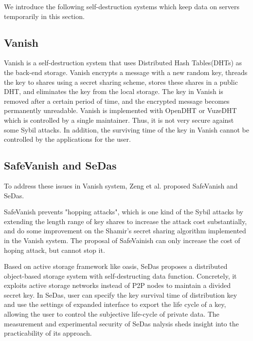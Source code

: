 \documentclass[a4paper,11pt]{report}
\begin{document}
We introduce the following self-destruction systems which keep data on servers temporarily in this section.

\subsection{Vanish}

Vanish\cite{geambasu2009vanish} is a self-destruction system that uses Distributed Hash Tables(DHTs) as the back-end storage.
Vanish encrypts a message with a new random key, threads the key to shares using a secret sharing scheme, stores these shares in a public DHT, and eliminates the key from the local storage.
The key in Vanish is removed after a certain period of time, and the encrypted message becomes permanently unreadable.
Vanish is implemented with OpenDHT\cite{rhea2005opendht} or VuzeDHT\cite{vuzedht} which is controlled by a single maintainer. 
Thus, it is not very secure against some Sybil attacks\cite{cholez2009evaluation, wolchok2010defeating}. 
In addition, the surviving time of the key in Vanish cannot be controlled by the applications for the user.

\subsection{SafeVanish and SeDas}

To address these issues in Vanish system, Zeng et al. proposed SafeVanish\cite{zeng2010safevanish} and SeDas\cite{zeng2012sedas}. 

SafeVanish prevents "hopping attacks"\cite{wolchok2010defeating}, which is one kind of the Sybil attacks\cite{cholez2009evaluation, wolchok2010defeating} by extending the length range of key shares to increase the attack cost substantially, and do some improvement on the Shamir's secret sharing algorithm implemented in the Vanish system.
The proposal of SafeVainish can only increase the cost of hoping attack, but cannot stop it.

Based on active storage framework like oasis\cite{xie2011design}, SeDas proposes a distributed object-based storage system with self-destructing data function.
Concretely, it exploits active storage networks instead of P2P nodes to maintain a divided secret key. 
In SeDas, user can specify the key survival time of distribution key and use the settings of expanded interface to export the life cycle of a key, allowing the user to control the subjective life-cycle of private data.
The measurement and experimental security of SeDas nalysis sheds insight into the practicability of its approach.
\end{document}
